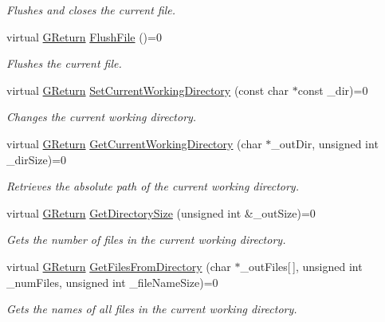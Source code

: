 \begin{DoxyCompactItemize}
\begin{DoxyCompactList}\small\item\em Flushes and closes the current file. \end{DoxyCompactList}\item 
virtual \mbox{\hyperlink{namespaceGW_a67a839e3df7ea8a5c5686613a7a3de21}{G\+Return}} \mbox{\hyperlink{classGW_1_1SYSTEM_1_1GFile_ae3105b637ef87af268722a696b8657a9}{Flush\+File}} ()=0
\begin{DoxyCompactList}\small\item\em Flushes the current file. \end{DoxyCompactList}\item 
virtual \mbox{\hyperlink{namespaceGW_a67a839e3df7ea8a5c5686613a7a3de21}{G\+Return}} \mbox{\hyperlink{classGW_1_1SYSTEM_1_1GFile_ab28d2e7ecf3ac893df88603e5448561a}{Set\+Current\+Working\+Directory}} (const char $\ast$const \+\_\+dir)=0
\begin{DoxyCompactList}\small\item\em Changes the current working directory. \end{DoxyCompactList}\item 
virtual \mbox{\hyperlink{namespaceGW_a67a839e3df7ea8a5c5686613a7a3de21}{G\+Return}} \mbox{\hyperlink{classGW_1_1SYSTEM_1_1GFile_a6853b717e838d1b3a54f22449a37d764}{Get\+Current\+Working\+Directory}} (char $\ast$\+\_\+out\+Dir, unsigned int \+\_\+dir\+Size)=0
\begin{DoxyCompactList}\small\item\em Retrieves the absolute path of the current working directory. \end{DoxyCompactList}\item 
virtual \mbox{\hyperlink{namespaceGW_a67a839e3df7ea8a5c5686613a7a3de21}{G\+Return}} \mbox{\hyperlink{classGW_1_1SYSTEM_1_1GFile_ac2de86bf6cf61455577efc47277ecb94}{Get\+Directory\+Size}} (unsigned int \&\+\_\+out\+Size)=0
\begin{DoxyCompactList}\small\item\em Gets the number of files in the current working directory. \end{DoxyCompactList}\item 
virtual \mbox{\hyperlink{namespaceGW_a67a839e3df7ea8a5c5686613a7a3de21}{G\+Return}} \mbox{\hyperlink{classGW_1_1SYSTEM_1_1GFile_ae062d19f84d120adea94756d1d26e41e}{Get\+Files\+From\+Directory}} (char $\ast$\+\_\+out\+Files\mbox{[}$\,$\mbox{]}, unsigned int \+\_\+num\+Files, unsigned int \+\_\+file\+Name\+Size)=0
\begin{DoxyCompactList}\small\item\em Gets the names of all files in the current working directory. \end{DoxyCompactList}\item 

\end{DoxyCompactItemize}
